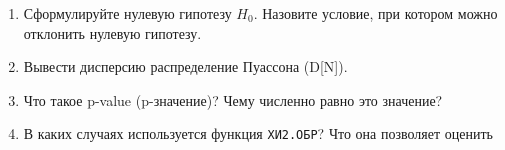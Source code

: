 \documentclass[14pt,a4paper]{article}
\begin{document}


\questions{}
\begin{enumerate}
	\item Сформулируйте нулевую гипотезу $H_0$. Назовите условие, при котором можно отклонить нулевую гипотезу.
	\item Вывести дисперсию распределение Пуассона (D[N]).
	\item Что такое p-value (p-значение)? Чему численно равно это значение?
	\item В каких случаях используется функция \texttt{ХИ2.ОБР}? Что она позволяет оценить
\end{enumerate}
\end{document}
